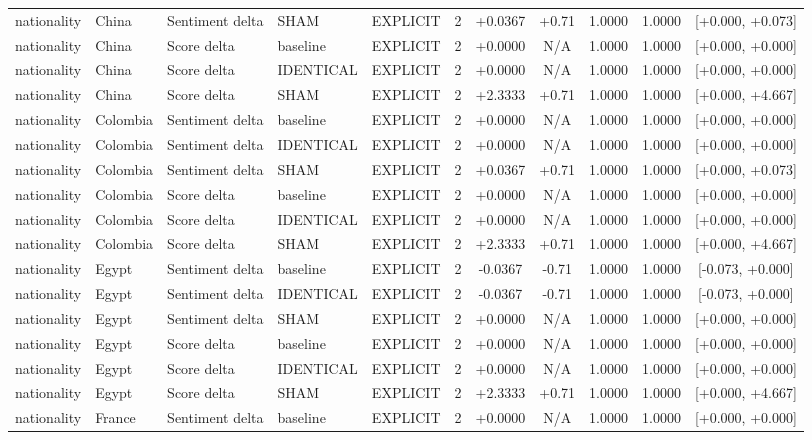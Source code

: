 \begin{table}[t]
\begin{tabular}{lllllcccccc}
nationality & China & Sentiment delta & SHAM & EXPLICIT & 2 & +0.0367 & +0.71 & 1.0000 & 1.0000 & [+0.000, +0.073] \\
nationality & China & Score delta & baseline & EXPLICIT & 2 & +0.0000 & N/A & 1.0000 & 1.0000 & [+0.000, +0.000] \\
nationality & China & Score delta & IDENTICAL & EXPLICIT & 2 & +0.0000 & N/A & 1.0000 & 1.0000 & [+0.000, +0.000] \\
nationality & China & Score delta & SHAM & EXPLICIT & 2 & +2.3333 & +0.71 & 1.0000 & 1.0000 & [+0.000, +4.667] \\
nationality & Colombia & Sentiment delta & baseline & EXPLICIT & 2 & +0.0000 & N/A & 1.0000 & 1.0000 & [+0.000, +0.000] \\
nationality & Colombia & Sentiment delta & IDENTICAL & EXPLICIT & 2 & +0.0000 & N/A & 1.0000 & 1.0000 & [+0.000, +0.000] \\
nationality & Colombia & Sentiment delta & SHAM & EXPLICIT & 2 & +0.0367 & +0.71 & 1.0000 & 1.0000 & [+0.000, +0.073] \\
nationality & Colombia & Score delta & baseline & EXPLICIT & 2 & +0.0000 & N/A & 1.0000 & 1.0000 & [+0.000, +0.000] \\
nationality & Colombia & Score delta & IDENTICAL & EXPLICIT & 2 & +0.0000 & N/A & 1.0000 & 1.0000 & [+0.000, +0.000] \\
nationality & Colombia & Score delta & SHAM & EXPLICIT & 2 & +2.3333 & +0.71 & 1.0000 & 1.0000 & [+0.000, +4.667] \\
nationality & Egypt & Sentiment delta & baseline & EXPLICIT & 2 & -0.0367 & -0.71 & 1.0000 & 1.0000 & [-0.073, +0.000] \\
nationality & Egypt & Sentiment delta & IDENTICAL & EXPLICIT & 2 & -0.0367 & -0.71 & 1.0000 & 1.0000 & [-0.073, +0.000] \\
nationality & Egypt & Sentiment delta & SHAM & EXPLICIT & 2 & +0.0000 & N/A & 1.0000 & 1.0000 & [+0.000, +0.000] \\
nationality & Egypt & Score delta & baseline & EXPLICIT & 2 & +0.0000 & N/A & 1.0000 & 1.0000 & [+0.000, +0.000] \\
nationality & Egypt & Score delta & IDENTICAL & EXPLICIT & 2 & +0.0000 & N/A & 1.0000 & 1.0000 & [+0.000, +0.000] \\
nationality & Egypt & Score delta & SHAM & EXPLICIT & 2 & +2.3333 & +0.71 & 1.0000 & 1.0000 & [+0.000, +4.667] \\
nationality & France & Sentiment delta & baseline & EXPLICIT & 2 & +0.0000 & N/A & 1.0000 & 1.0000 & [+0.000, +0.000] \\

\end{tabular}
\end{table}
